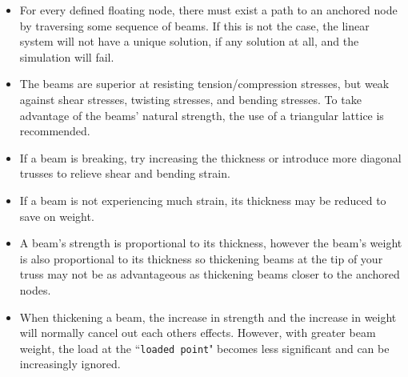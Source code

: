 \documentclass{article}
\begin{document}
\begin{itemize}
\item For every defined floating node, there must exist a path to an anchored node by traversing some sequence of beams. If this is not the case, the linear system will not have a unique solution, if any solution at all, and the simulation will fail.    
\item The beams are superior at resisting tension/compression stresses, but weak against shear stresses, twisting stresses, and bending stresses. To take advantage of the beams' natural strength, the use of a triangular lattice is recommended.   
\item If a beam is breaking, try increasing the thickness or introduce more diagonal trusses to relieve shear and bending strain.
\item If a beam is not experiencing much strain, its thickness may be reduced to save on weight.
\item A beam's strength is proportional to its thickness, however the beam's weight is also proportional to its thickness so thickening beams at the tip of your truss may not be as advantageous as thickening beams closer to the anchored nodes. 
\item When thickening a beam, the increase in strength and the increase in weight will normally cancel out each others effects. However, with greater beam weight, the load at the ``\texttt{loaded point}" becomes less significant and can be increasingly ignored.  
\end{itemize}
\end{document}
